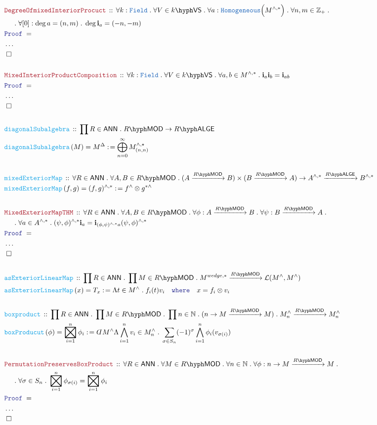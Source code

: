 \documentclass[12pt]{scrartcl}%
\newcommand{\TYPE}[1]{\textcolor{NavyBlue}{\mathtt{#1}}}%
\newcommand{\FUNC}[1]{\textcolor{Cerulean}{\mathtt{#1}}}%
\newcommand{\LOGIC}[1]{\textcolor{Blue}{\mathtt{#1}}}%
\newcommand{\THM}[1]{\textcolor{Maroon}{\mathtt{#1}}}%
\renewcommand{\.}{\; . \;} %
\newcommand{\de}{: \kern 0.1pc =} %
\newcommand{\where}{\LOGIC{where}} %
\newcommand{\Act}[1]{\left( #1 \right)} %
\newcommand{\Theorem}[2]{& \THM{#1} \, :: \, #2 \\ & \Proof = \\ } %
\newcommand{\DeclareFunc}[2]{& \FUNC{#1} \, :: \, #2 \\}%
\newcommand{\DefineNamedFunc}[4]{&  \FUNC{#1}\Act{#2} = #3 \de #4 \\}%
\newcommand{\NewLine}{\\ & \kern 1pc}%
\newcommand{\Page}[1]{ \begin{align*} #1 \end{align*}  }%
\newcommand{ \bd }{ \ByDef }%
\newcommand{\NoProof}{ & \ldots \\ \EndProof}%
\newcommand{\Int}{\mathbb{Z}}%
\newcommand{\Nat}{\mathbb{N}}%
\newcommand{\QED}{\; \square} %
\newcommand{\EndProof}{& \QED \\} %
\newcommand{\ByDef}{\rotatebox[origin=c]{-180}{$D$}}%
\newcommand{\Proof}{\LOGIC{Proof} \; } %
\newcommand{\Arrow}[1]{\xrightarrow{#1}}%
\DeclareMathOperator{\bigboxtimes}{\scalerel*{\boxtimes}{\sum}} %
\newcommand{\VS}[1]{#1\hyph\mathsf{VS}} %
\newcommand{\LMOD}[1]{#1\hyph\mathsf{MOD}} %
\renewcommand{\L}{\mathcal{L}}
\newcommand{\Field}{\TYPE{Field}}
\newcommand{\ANN}{\mathsf{ANN}} %
\newcommand{\LALGE}[1]{#1\hyph\mathsf{ALGE}}%
\begin{document}
\Page{
	\Theorem{DegreeOfmixedInteriorProcuct}
	{
		\forall k : \Field \.
		\forall V \in \VS{k} \. 
		\forall a : \TYPE{Homogeneous}\Big(  M^{\wedge,*} \Big)\.
		\forall n,m \in \Int_+ \.
		\NewLine \.
		\forall [0]  : \deg a = (n,m) \.
		\deg \mathbf{i}_a = (-n,-m)
	}
	\NoProof
	\\
	\Theorem{MixedInteriorProductComposition }
	{
		\forall k : \Field \.
		\forall V \in \VS{k} \.
		\forall a,b \in M^{\wedge,*} \.
		\mathbf{i}_a \mathbf{i}_b = \mathbf{i}_{ab}
	}
	\NoProof
	\\
	\DeclareFunc{diagonalSubalgebra}
	{
		\prod R \in \ANN \. 
		\LMOD{R} \to \LALGE{R}
	}
	\DefineNamedFunc{diagonalSubalgebra}{M}{M^\Delta}{ \bigoplus^\infty_{n=0} M^{\wedge,\star}_{(n,n)}}
	\\
	\DeclareFunc{mixedExteriorMap}{
		\forall R \in \ANN \. 
		\forall A,B \in \LMOD{R} \.
		(A \Arrow{\LMOD{R}} B) 
		\times
		(B \Arrow{\LMOD{R}} A) \to
		A^{\wedge,*} \Arrow{\LALGE{R}} B^{\wedge,*}
	}
	\DefineNamedFunc{mixedExteriorMap}{f,g}{(f,g)^{\wedge,*}}{f^{\wedge}\otimes g^{*\wedge}}
	\\
	\Theorem{MixedExteriorMapTHM}{
		\forall R \in \ANN \. 
		\forall A,B \in \LMOD{R} \.
		\forall \phi : A \Arrow{\LMOD{R}} B \.
		\forall \psi : B \Arrow{\LMOD{R}} A \.
		\NewLine \. 
		\forall a \in  A^{\wedge,*} \.
		(\psi,\phi)^{\wedge,*} \mathbf{i}_a =
		\mathbf{i}_{(\phi,\psi)^{\wedge,*}a} (\psi,\phi)^{\wedge,*}
	}
	\NoProof
	\\
	\DeclareFunc{asExteriorLinearMap}
	{
		\prod R \in \ANN \.
		\prod M \in \LMOD{R} \.
		M^{wedge,*} \Arrow{\LMOD{R}} \L(M^{\wedge},M^{\wedge})
	}
	\DefineNamedFunc{asExteriorLinearMap}{x}{T_x}{\Lambda t \in M^\wedge \. f_i(t)v_i \quad \where \quad x = f_i \otimes v_i}
	\\
	\DeclareFunc{boxproduct}
	{
		\prod R \in \ANN \.
		\prod M \in \LMOD{R} \.
		\prod n \in \Nat \.
		(n \to M \Arrow{\LMOD{R}} M) \. 
		M^{\wedge}_n \Arrow{\LMOD{R}} M^\wedge_n 
	}
	\DefineNamedFunc{boxProducut}{\phi}{\bigboxtimes^n_{i=1} \phi_i }{ \bd M^\wedge \Lambda \bigwedge^n_{i=1} v_i \in M^\wedge_n \. \sum_{\sigma \in S_n} (-1)^\sigma \bigwedge^n_{i=1} \phi_i(v_{\sigma(i)})  }
	\\
	\Theorem{PermutationPreservesBoxProduct}
	{
		\forall R \in \ANN \.
		\forall M \in \LMOD{R} \.
		\forall n \in \Nat \.
		\forall \phi : n \to M \Arrow{\LMOD{R}} M \. \NewLine \.  
		\forall \sigma \in S_n \.
		\bigboxtimes^n_{i=1} \phi_{\sigma(i)} = \bigboxtimes^n_{i=1} \phi_i
	}
	\NoProof
}
\end{document}
